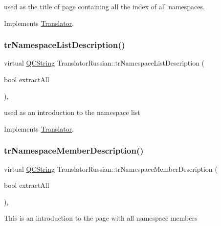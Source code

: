 used as the title of page containing all the index of all namespaces. 

Implements \mbox{\hyperlink{class_translator}{Translator}}.

\mbox{\label{class_translator_russian_aa6f7001d4df8aab419095169d207ddc9}} 
\subsubsection{\texorpdfstring{trNamespaceListDescription()}{trNamespaceListDescription()}}
{\footnotesize\ttfamily virtual \mbox{\hyperlink{class_q_c_string}{Q\+C\+String}} Translator\+Russian\+::tr\+Namespace\+List\+Description (\begin{DoxyParamCaption}\item[{bool}]{extract\+All }\end{DoxyParamCaption})\hspace{0.3cm}{\ttfamily [inline]}, {\ttfamily [virtual]}}

used as an introduction to the namespace list 

Implements \mbox{\hyperlink{class_translator}{Translator}}.

\mbox{\label{class_translator_russian_a7661ec2fdaab725afa238051733ed3c0}} 
\subsubsection{\texorpdfstring{trNamespaceMemberDescription()}{trNamespaceMemberDescription()}}
{\footnotesize\ttfamily virtual \mbox{\hyperlink{class_q_c_string}{Q\+C\+String}} Translator\+Russian\+::tr\+Namespace\+Member\+Description (\begin{DoxyParamCaption}\item[{bool}]{extract\+All }\end{DoxyParamCaption})\hspace{0.3cm}{\ttfamily [inline]}, {\ttfamily [virtual]}}

This is an introduction to the page with all namespace members 

